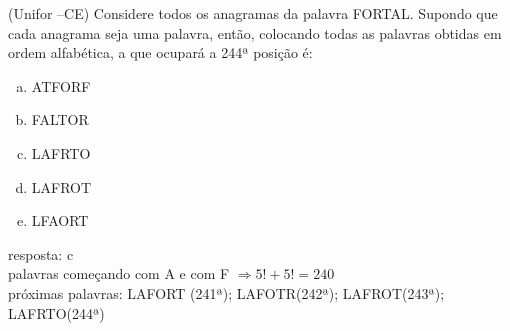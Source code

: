 \begin{ex}
(Unifor –CE) Considere todos os anagramas da palavra FORTAL. Supondo que cada anagrama seja uma palavra, então, colocando todas as palavras obtidas em ordem alfabética, a que ocupará a 244ª posição é:
   \begin{enumerate}[(a)]
   \item ATFORF
   \item FALTOR
   \item LAFRTO
   \item LAFROT
   \item LFAORT
   \end{enumerate}
     \begin{sol}
       resposta: c \\
       palavras começando com A e com F  $\Longrightarrow 5!+5!=240$ \\
       próximas palavras: LAFORT (241ª); LAFOTR(242ª); LAFROT(243ª); LAFRTO(244ª)
       \end{sol}
\end{ex}